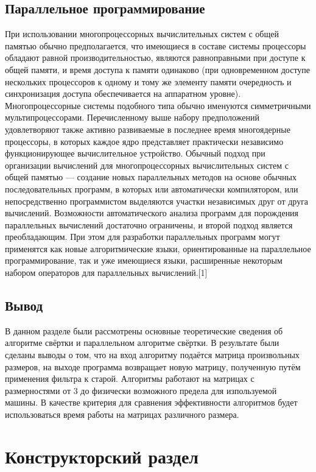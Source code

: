 \section{Параллельное программирование}
При использовании многопроцессорных вычислительных систем с общей памятью обычно предполагается, что имеющиеся в составе системы
процессоры обладают равной производительностью, являются равноправными при доступе к общей памяти, и время доступа к памяти одинаково (при одновременном доступе нескольких процессоров к одному и тому же элементу памяти очередность и синхронизация доступа обеспечивается на аппаратном уровне). Многопроцессорные системы подобного типа обычно именуются симметричными мультипроцессорами. Перечисленному выше набору предположений удовлетворяют также активно развиваемые в последнее время многоядерные процессоры, в которых каждое ядро представляет практически независимо функционирующее вычислительное устройство. Обычный подход при организации вычислений для многопроцессорных вычислительных систем с общей памятью — создание новых параллельных методов на основе обычных последовательных программ, в которых или автоматически компилятором, или непосредственно программистом выделяются участки независимых друг от друга вычислений. Возможности автоматического анализа программ для порождения параллельных вычислений достаточно ограничены, и второй подход является преобладающим. При этом для разработки параллельных программ могут применятся как новые алгоритмические языки, ориентированные на параллельное программирование, так и уже имеющиеся языки, расширенные некоторым набором операторов для параллельных вычислений.[1]

\section{Вывод}
В данном разделе были рассмотрены основные теоретические сведения об алгоритме свёртки и параллельном алгоритме свёртки. В результате были сделаны выводы о том, что на вход алгоритму подаётся матрица произвольных размеров, на выходе программа возвращает новую матрицу, полученную путём применения фильтра к старой. Алгоритмы работают на матрицах с размерностями от 3 до физически возможного предела для изпользуемой машины. В качестве критерия для сравнения эффективности алгоритмов будет использоваться время работы на матрицах различного размера.

\chapter{Конструкторский раздел}

